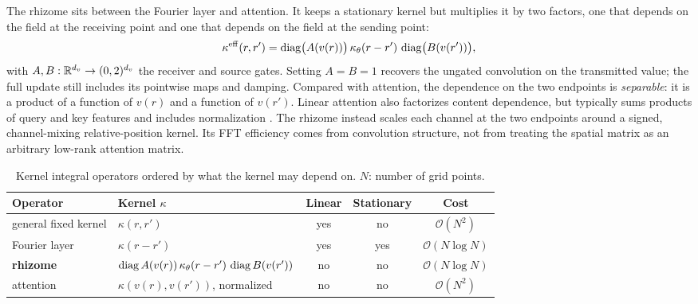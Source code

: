 The rhizome sits between the Fourier layer and attention. It keeps a stationary kernel but multiplies it by two factors, one that depends on the field at the receiving point and one that depends on the field at the sending point:
\begin{equation}
  \label{eq:rhizome-effective-kernel}
  \kappa^{\mathrm{eff}}(r,r') = \operatorname{diag}\!\big(A(v(r))\big)\,\kappa_\theta(r-r')\,\operatorname{diag}\!\big(B(v(r'))\big),
\end{equation}
with $A,B: \mathbb{R}^{d_v}\to(0,2)^{d_v}$ the receiver and source gates. Setting $A=B=1$ recovers the ungated convolution on the transmitted value; the full update still includes its pointwise maps and damping. Compared with attention, the dependence on the two endpoints is \emph{separable}: it is a product of a function of $v(r)$ and a function of $v(r')$. Linear attention also factorizes content dependence, but typically sums products of query and key features and includes normalization \citep{katharopoulos2020linear}. The rhizome instead scales each channel at the two endpoints around a signed, channel-mixing relative-position kernel. Its FFT efficiency comes from convolution structure, not from treating the spatial matrix as an arbitrary low-rank attention matrix.

\begin{table}[!tp]
  \centering
  \caption{Kernel integral operators ordered by what the kernel may depend on. $N$: number of grid points.}
  \label{tab:kernel-hierarchy}
  \small
  \setlength{\tabcolsep}{4pt}
  \begin{tabular}{@{}llccc@{}}
    \toprule
    Operator & Kernel $\kappa$ & Linear & Stationary & Cost \\
    \midrule
    general fixed kernel & $\kappa(r,r')$ & yes & no & $\mathcal{O}(N^2)$ \\
    Fourier layer & $\kappa(r-r')$ & yes & yes & $\mathcal{O}(N\log N)$ \\
    \textbf{rhizome} & $\operatorname{diag} A(v(r))\,\kappa_\theta(r-r')\,\operatorname{diag} B(v(r'))$ & no & no & $\mathcal{O}(N\log N)$ \\
    attention & $\kappa(v(r),v(r'))$, normalized & no & no & $\mathcal{O}(N^2)$ \\
    \bottomrule
  \end{tabular}
\end{table}

